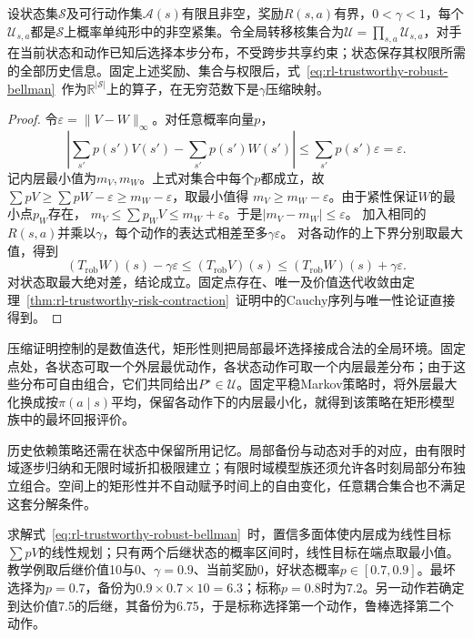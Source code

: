 \begin{theorem}[矩形鲁棒Bellman算子的压缩性]
  \label{thm:rl-trustworthy-robust-contraction}
  设状态集$\mathcal S$及可行动作集$\mathcal A(s)$有限且非空，奖励$R(s,a)$有界，$0<\gamma<1$，每个$\mathcal U_{s,a}$都是$\mathcal S$上概率单纯形中的非空紧集。令全局转移核集合为$\mathcal U=\prod_{s,a}\mathcal U_{s,a}$，对手在当前状态和动作已知后选择本步分布，不受跨步共享约束；状态保存其权限所需的全部历史信息。固定上述奖励、集合与权限后，式~\eqref{eq:rl-trustworthy-robust-bellman}~作为$\mathbb R^{|\mathcal S|}$上的算子，在无穷范数下是$\gamma$压缩映射。
\end{theorem}
\begin{proof}
  令$\varepsilon=\lVert V-W\rVert_\infty$。对任意概率向量$p$，
  \[
    \left|\sum_{s'}p(s')V(s')-\sum_{s'}p(s')W(s')\right|
      \leq\sum_{s'}p(s')\varepsilon=\varepsilon.
  \]
  记内层最小值为$m_V,m_W$。上式对集合中每个$p$都成立，故
  $\sum pV\geq\sum pW-\varepsilon\geq m_W-\varepsilon$，取最小值得
  $m_V\geq m_W-\varepsilon$。由于紧性保证$W$的最小点$p_W$存在，
  $m_V\leq\sum p_WV\leq m_W+\varepsilon$。于是$|m_V-m_W|\leq\varepsilon$。
  加入相同的$R(s,a)$并乘以$\gamma$，每个动作的表达式相差至多$\gamma\varepsilon$。
  对各动作的上下界分别取最大值，得到
  \[
    (T_{\mathrm{rob}}W)(s)-\gamma\varepsilon
      \leq(T_{\mathrm{rob}}V)(s)
      \leq(T_{\mathrm{rob}}W)(s)+\gamma\varepsilon.
  \]
  对状态取最大绝对差，结论成立。固定点存在、唯一及价值迭代收敛由定理~\ref{thm:rl-trustworthy-risk-contraction}~证明中的Cauchy序列与唯一性论证直接得到。
\end{proof}

压缩证明控制的是数值迭代，矩形性则把局部最坏选择接成合法的全局环境。固定点处，各状态可取一个外层最优动作，各状态动作可取一个内层最差分布；由于这些分布可自由组合，它们共同给出$P^\star\in\mathcal U$。固定平稳Markov策略时，将外层最大化换成按$\pi(a\mid s)$平均，保留各动作下的内层最小化，就得到该策略在矩形模型族中的最坏回报评价。

历史依赖策略还需在状态中保留所用记忆。局部备份与动态对手的对应，由有限时域逐步归纳和无限时域折扣极限建立；有限时域模型族还须允许各时刻局部分布独立组合。空间上的矩形性并不自动赋予时间上的自由变化，任意耦合集合也不满足这套分解条件。

求解式~\eqref{eq:rl-trustworthy-robust-bellman}~时，置信多面体使内层成为线性目标$\sum pV$的线性规划；只有两个后继状态的概率区间时，线性目标在端点取最小值。教学例取后继价值10与0、$\gamma=0.9$、当前奖励0，好状态概率$p\in[0.7,0.9]$。最坏选择为$p=0.7$，备份为$0.9\times0.7\times10=6.3$；标称$p=0.8$时为7.2。另一动作若确定到达价值7.5的后继，其备份为6.75，于是标称选择第一个动作，鲁棒选择第二个动作。

